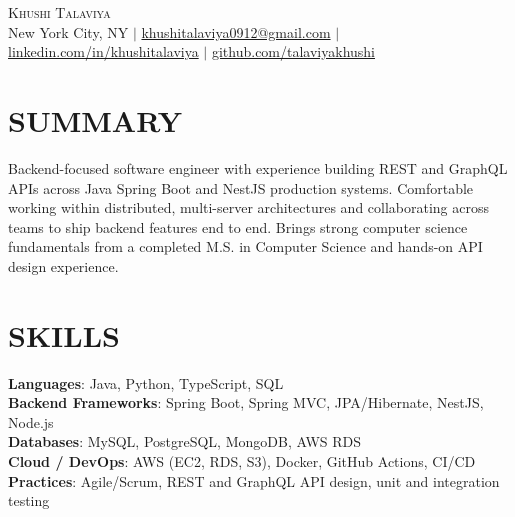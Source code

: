 \documentclass[letterpaper,11pt]{article}
\begin{document}
\begin{center}
    {\Huge \scshape Khushi Talaviya} \\ \vspace{2pt}
    \vspace{4pt}
    \small
    New York City, NY $|$
    \href{mailto:khushitalaviya0912@gmail.com}{khushitalaviya0912@gmail.com} $|$
    \href{https://www.linkedin.com/in/khushitalaviya/}{linkedin.com/in/khushitalaviya} $|$
    \href{https://github.com/talaviyakhushi}{github.com/talaviyakhushi}
\end{center}

\section{SUMMARY}
\vspace{5pt}
\small{Backend-focused software engineer with experience building REST and GraphQL APIs across Java Spring Boot and NestJS production systems. Comfortable working within distributed, multi-server architectures and collaborating across teams to ship backend features end to end. Brings strong computer science fundamentals from a completed M.S. in Computer Science and hands-on API design experience.}

\vspace{2pt}
\section{SKILLS}
\vspace{5pt}
\begin{itemize}[leftmargin=0in, label={}]
\small{\item{
\textbf{Languages}{: Java, Python, TypeScript, SQL} \\
\textbf{Backend Frameworks}{: Spring Boot, Spring MVC, JPA/Hibernate, NestJS, Node.js} \\
\textbf{Databases}{: MySQL, PostgreSQL, MongoDB, AWS RDS} \\
\textbf{Cloud / DevOps}{: AWS (EC2, RDS, S3), Docker, GitHub Actions, CI/CD} \\
\textbf{Practices}{: Agile/Scrum, REST and GraphQL API design, unit and integration testing}
}}
\end{itemize}
\vspace{-10pt}

\end{document}
